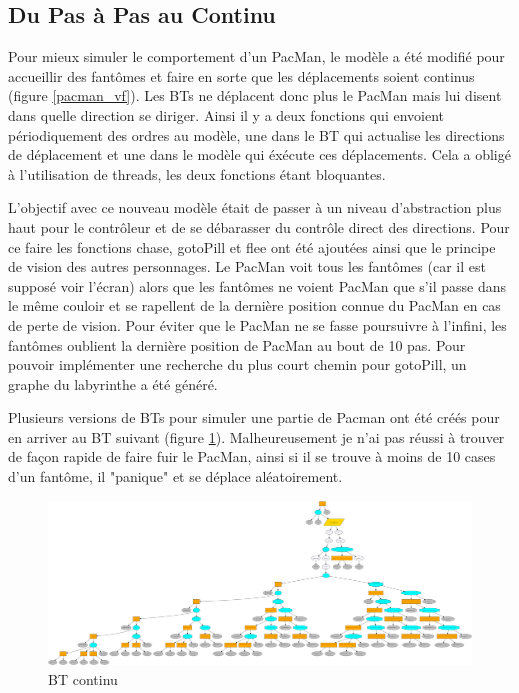 \documentclass[11pt]{article}
\begin{document}
\clearpage
\subsection{Du Pas à Pas au Continu}
\label{sec-3-3}
Pour mieux simuler le comportement d'un PacMan, le modèle a été modifié pour accueillir des fantômes et faire en sorte que les déplacements soient continus (figure \ref{pacman_vf}).
Les BTs ne déplacent donc plus le PacMan mais lui disent dans quelle direction se diriger.
Ainsi il y a deux fonctions qui envoient périodiquement des ordres au modèle, une dans le BT qui actualise les directions de déplacement et une dans le modèle qui éxécute ces déplacements.
Cela a obligé à l'utilisation de threads, les deux fonctions étant bloquantes.

L'objectif avec ce nouveau modèle était de passer à un niveau d'abstraction plus haut pour le contrôleur et de se débarasser du contrôle direct des directions.
Pour ce faire les fonctions chase, gotoPill et flee ont été ajoutées ainsi que le principe de vision des autres personnages.
Le PacMan voit tous les fantômes (car il est supposé voir l'écran) alors que les fantômes ne voient PacMan que s'il passe dans le même couloir et se rapellent de la dernière position connue du PacMan en cas de perte de vision.
Pour éviter que le PacMan ne se fasse poursuivre à l'infini, les fantômes oublient la dernière position de PacMan au bout de 10 pas.
Pour pouvoir implémenter une recherche du plus court chemin pour gotoPill, un graphe du labyrinthe a été généré.

Plusieurs versions de BTs pour simuler une partie de Pacman ont été créés pour en arriver au BT suivant (figure \ref{bt_final}).
Malheureusement je n'ai pas réussi à trouver de façon rapide de faire fuir le PacMan, ainsi si il se trouve à moins de 10 cases d'un fantôme, il "panique" et se déplace aléatoirement.

\begin{figure}[htb]
\centering
\includegraphics[width=.9\linewidth]{./img/LastPacMan.png}
\caption{\label{bt_final}BT continu}
\end{figure}
\end{document}

